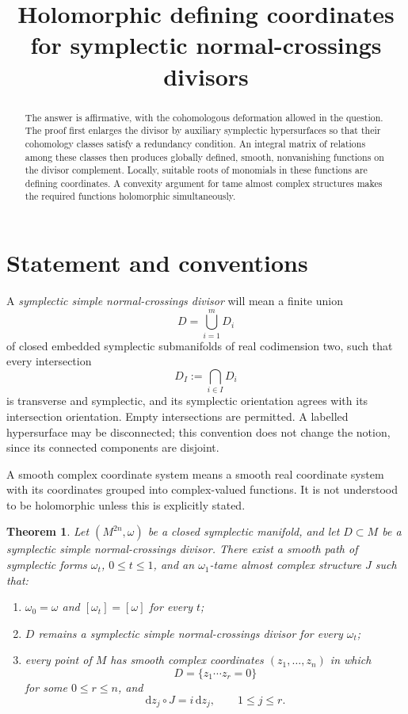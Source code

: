 \documentclass[11pt]{amsart}
\title{Holomorphic defining coordinates for symplectic normal-crossings divisors}
\date{}
\newtheorem{theorem}{Theorem}[section]
\theoremstyle{definition}
\theoremstyle{remark}
\newcommand{\dd}{\mathrm d}
\begin{document}
\begin{abstract}
The answer is affirmative, with the cohomologous deformation allowed in
the question.  The proof first enlarges the divisor by auxiliary
symplectic hypersurfaces so that their cohomology classes satisfy a
redundancy condition.  An integral matrix of relations among these
classes then produces globally defined, smooth, nonvanishing functions
on the divisor complement.  Locally, suitable roots of monomials in
these functions are defining coordinates.  A convexity argument for
tame almost complex structures makes the required functions
holomorphic simultaneously.
\end{abstract}

\maketitle

\section{Statement and conventions}

A \emph{symplectic simple normal-crossings divisor} will mean a finite
union
\[
D=\bigcup_{i=1}^{m}D_i
\]
of closed embedded symplectic submanifolds of real codimension two,
such that every intersection
\[
D_I:=\bigcap_{i\in I}D_i
\]
is transverse and symplectic, and its symplectic orientation agrees
with its intersection orientation.  Empty intersections are permitted.
A labelled hypersurface may be disconnected; this convention does not
change the notion, since its connected components are disjoint.

A smooth complex coordinate system means a smooth real coordinate
system with its coordinates grouped into complex-valued functions.
It is not understood to be holomorphic unless this is explicitly
stated.

\begin{theorem}\label{thm:main}
Let $(M^{2n},\omega)$ be a closed symplectic manifold, and let
$D\subset M$ be a symplectic simple normal-crossings divisor.
There exist a smooth path of symplectic forms $\omega_t$, $0\leq t\leq1$,
and an $\omega_1$-tame almost complex structure $J$ such that:
\begin{enumerate}[label=\textup{(\roman*)}]
\item $\omega_0=\omega$ and $[\omega_t]=[\omega]$ for every $t$;
\item $D$ remains a symplectic simple normal-crossings divisor for
      every $\omega_t$;
\item every point of $M$ has smooth complex coordinates
      $(z_1,\ldots,z_n)$ in which
      \[
      D=\{z_1\cdots z_r=0\}
      \]
      for some $0\leq r\leq n$, and
      \[
      \dd z_j\circ J=i\,\dd z_j,\qquad 1\leq j\leq r.
      \]
\end{enumerate}
\end{theorem}
\end{document}
